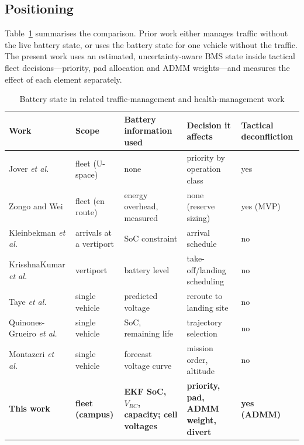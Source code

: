 \documentclass[journal]{IEEEtran}
\begin{document}
\subsection{Positioning}
Table~\ref{tab:related} summarises the comparison. Prior work either manages traffic without the live battery state, or uses the battery state for one vehicle without the traffic. The present work uses an estimated, uncertainty-aware BMS state inside tactical fleet decisions---priority, pad allocation and ADMM weights---and measures the effect of each element separately.

\begin{table}[t]
\centering
\caption{Battery state in related traffic-management and health-management work}
\label{tab:related}
\footnotesize
\begin{tabular}{@{}p{}p{}p{}p{}p{}@{}}
\toprule
Work & Scope & Battery information used & Decision it affects & Tactical deconfliction \\
\midrule
Jover \textit{et al.}~\cite{jover2022priority} & fleet (U-space) & none & priority by operation class & yes \\
Zongo and Wei~\cite{zongo2026overhead} & fleet (en route) & energy overhead, measured & none (reserve sizing) & yes (MVP) \\
Kleinbekman \textit{et al.}~\cite{kleinbekman2018evtol} & arrivals at a vertiport & SoC constraint & arrival schedule & no \\
KrisshnaKumar \textit{et al.}~\cite{krisshnakumar2023vertiport} & vertiport & battery level & take-off/landing scheduling & no \\
Taye \textit{et al.}~\cite{taye2025safe} & single vehicle & predicted voltage & reroute to landing site & no \\
Quinones-Grueiro \textit{et al.}~\cite{quinones2020decision} & single vehicle & SoC, remaining life & trajectory selection & no \\
Montazeri \textit{et al.}~\cite{montazeri2024health} & single vehicle & forecast voltage curve & mission order, altitude & no \\
\textbf{This work} & \textbf{fleet (campus)} & \textbf{EKF SoC, $V_{RC}$, capacity; cell voltages} & \textbf{priority, pad, ADMM weight, divert} & \textbf{yes (ADMM)} \\
\bottomrule
\end{tabular}
\end{table}

\end{document}
